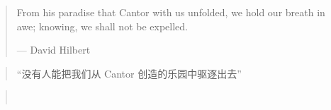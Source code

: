 \begin{frame}{}
  \begin{quote}
    From his paradise that Cantor with us unfolded,
    we hold our breath in awe; knowing, we shall not be expelled.

    \hfill --- David Hilbert
  \end{quote}

  \vspace{0.80cm}
  \begin{quote}
    \centerline{``没有人能把我们从 Cantor 创造的乐园中驱逐出去''}
  \end{quote}

  \pause
\end{frame}

\begin{frame}{}

  \pause
  \begin{quote}
    \begin{center}
       \\[8pt]

      \pause
    \end{center}
  \end{quote}
\end{frame}
